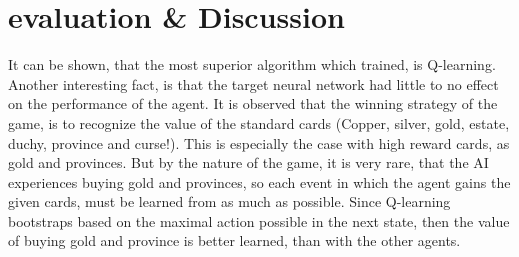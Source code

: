 \chapter{evaluation \& Discussion} \label{ch:eval}

It can be shown, that the most superior algorithm which trained, is Q-learning. Another interesting fact, is that the target neural network had little to no effect on the performance of the agent. It is observed that the winning strategy of the game, is to recognize the value of the standard cards (Copper, silver, gold, estate, duchy, province and curse!). This is especially the case with high reward cards, as gold and provinces. But by the nature of the game, it is very rare, that the AI experiences buying gold and provinces, so each event in which the agent gains the given cards, must be learned from as much as possible. Since Q-learning bootstraps based on the maximal action possible in the next state, then the value of buying gold and province is better learned, than with the other agents.
